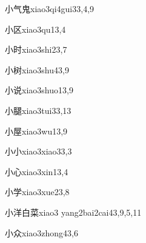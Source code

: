 \begin{verbete}{小气鬼}{xiao3qi4gui3}{3,4,9}
\end{verbete}

\begin{verbete}{小区}{xiao3qu1}{3,4}
\end{verbete}

\begin{verbete}{小时}{xiao3shi2}{3,7}
\end{verbete}

\begin{verbete}{小树}{xiao3shu4}{3,9}
\end{verbete}

\begin{verbete}{小说}{xiao3shuo1}{3,9}
\end{verbete}

\begin{verbete}{小腿}{xiao3tui3}{3,13}
\end{verbete}

\begin{verbete}{小屋}{xiao3wu1}{3,9}
\end{verbete}

\begin{verbete}{小小}{xiao3xiao3}{3,3}
\end{verbete}

\begin{verbete}{小心}{xiao3xin1}{3,4}
\end{verbete}

\begin{verbete}{小学}{xiao3xue2}{3,8}
\end{verbete}

\begin{verbete}{小洋白菜}{xiao3 yang2bai2cai4}{3,9,5,11}
\end{verbete}

\begin{verbete}{小众}{xiao3zhong4}{3,6}
\end{verbete}

